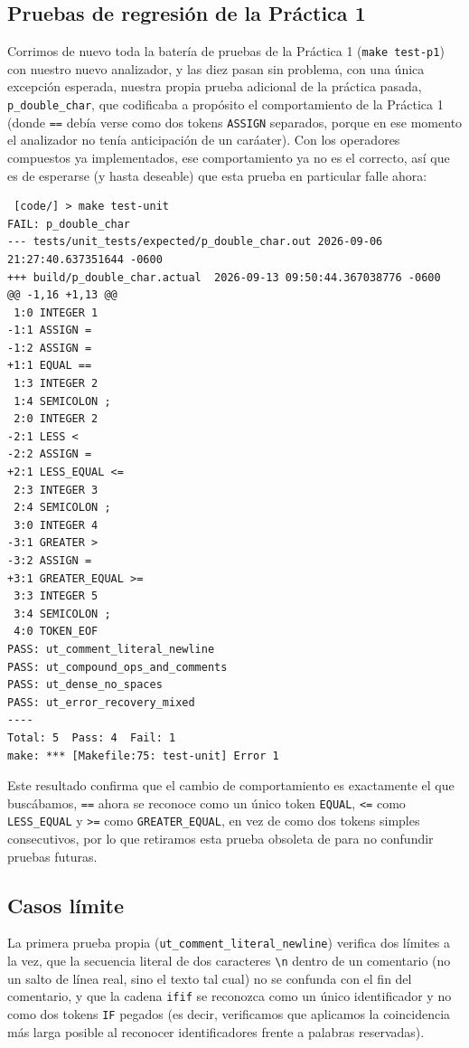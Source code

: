 \documentclass[12pt,letterpaper]{article}
\begin{document}
\subsection*{Pruebas de regresión de la Práctica 1}

Corrimos de nuevo toda la batería de pruebas de la Práctica 1 (\texttt{make test-p1}) con nuestro nuevo
analizador, y las diez pasan sin problema, con una única excepción esperada, nuestra propia prueba adicional de
la práctica pasada, \texttt{p\_double\_char}, que codificaba a propósito el comportamiento de la Práctica 1
(donde \texttt{==} debía verse como dos tokens \texttt{ASSIGN} separados, porque en ese momento el analizador no
tenía anticipación de un caráater). Con los operadores compuestos ya implementados, ese comportamiento ya no
es el correcto, así que es de esperarse (y hasta deseable) que esta prueba en particular falle ahora:

\begin{verbatim}
 [code/] > make test-unit
FAIL: p_double_char
--- tests/unit_tests/expected/p_double_char.out	2026-09-06 21:27:40.637351644 -0600
+++ build/p_double_char.actual	2026-09-13 09:50:44.367038776 -0600
@@ -1,16 +1,13 @@
 1:0 INTEGER 1
-1:1 ASSIGN =
-1:2 ASSIGN =
+1:1 EQUAL ==
 1:3 INTEGER 2
 1:4 SEMICOLON ;
 2:0 INTEGER 2
-2:1 LESS <
-2:2 ASSIGN =
+2:1 LESS_EQUAL <=
 2:3 INTEGER 3
 2:4 SEMICOLON ;
 3:0 INTEGER 4
-3:1 GREATER >
-3:2 ASSIGN =
+3:1 GREATER_EQUAL >=
 3:3 INTEGER 5
 3:4 SEMICOLON ;
 4:0 TOKEN_EOF
PASS: ut_comment_literal_newline
PASS: ut_compound_ops_and_comments
PASS: ut_dense_no_spaces
PASS: ut_error_recovery_mixed
----
Total: 5  Pass: 4  Fail: 1
make: *** [Makefile:75: test-unit] Error 1
\end{verbatim}

Este resultado confirma que el cambio de comportamiento es exactamente el que buscábamos, \texttt{==} ahora se
reconoce como un único token \texttt{EQUAL}, \texttt{<=} como \texttt{LESS\_EQUAL} y \texttt{>=} como
\texttt{GREATER\_EQUAL}, en vez de como dos tokens simples consecutivos, por lo que retiramos esta prueba
obsoleta de para no confundir pruebas futuras.

\subsection*{Casos límite}

La primera prueba propia (\texttt{ut\_comment\_literal\_newline}) verifica dos límites a la vez, que la
secuencia literal de dos caracteres \texttt{\textbackslash n} dentro de un comentario (no un salto de línea
real, sino el texto tal cual) no se confunda con el fin del comentario, y que la cadena \texttt{ifif} se
reconozca como un único identificador y no como dos tokens \texttt{IF} pegados (es decir, verificamos que
aplicamos la coincidencia más larga posible al reconocer identificadores frente a palabras reservadas).
\end{document}

